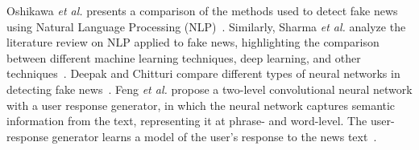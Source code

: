 \documentclass{ieeeaccess}
\begin{document}
Oshikawa \textit {et al.} presents a comparison of the methods used to detect fake news using Natural Language Processing (NLP)~\cite{oshikawa2018survey}. Similarly, Sharma \textit{et al.} analyze the literature review on NLP applied to fake news, highlighting the comparison between different machine learning techniques, deep learning, and other techniques~\cite{sharma2019combating}. Deepak and Chitturi compare different types of neural networks in detecting fake news~\cite{deepak-lstm}. Feng \textit{et al.} propose a two-level convolutional neural network with a user response generator, in which the neural network captures semantic information from the text, representing it at  phrase- and word-level. The user-response generator learns a model of the user's response to the news text~\cite{fengAndSharma}.




\end{document}
